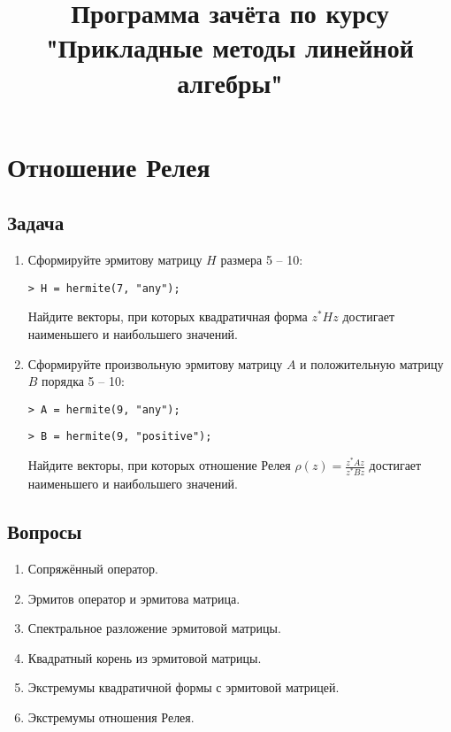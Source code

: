 \documentclass[a4paper,12pt]{article}
\newenvironment{Matlab}{\par \vspace{0.2cm}}{\vspace{0.2cm} \par}
\newcommand{\Mcommand}[1]{\noindent \texttt{> #1} \par}
\newcommand{\matlab}[1]{\begin{Matlab} \Mcommand{#1} \end{Matlab}}
\begin{document}
\title{Программа зачёта по курсу \\ "Прикладные методы линейной алгебры"}
\date{}
\author{}
\maketitle

\section{Отношение Релея}

\subsection{Задача}

\begin{enumerate}
    \item Сформируйте эрмитову матрицу $H$ размера 5 -- 10:
        \matlab{H = hermite(7, "any");}
        Найдите векторы, при которых квадратичная форма $z^* H z$ достигает наименьшего и наибольшего значений.

    \item Сформируйте произвольную эрмитову матрицу $A$ и положительную матрицу $B$ порядка 5 -- 10:
    \begin{Matlab}
        \Mcommand{A = hermite(9, "any");}
        \Mcommand{B = hermite(9, "positive");}
    \end{Matlab}
        Найдите векторы, при которых отношение Релея $\rho(z) = \frac{z^* A z}{z^* B z}$ достигает наименьшего и наибольшего значений.
\end{enumerate}

\subsection{Вопросы}

\begin{enumerate}
    \item Сопряжённый оператор.
    \item Эрмитов оператор и эрмитова матрица.
    \item Спектральное разложение эрмитовой матрицы.
    \item Квадратный корень из эрмитовой матрицы.
    \item Экстремумы квадратичной формы с эрмитовой матрицей.
    \item Экстремумы отношения Релея.
\end{enumerate}
\end{document}
